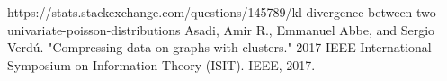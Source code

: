 \documentclass{article}
\begin{document}
\begin{thebibliography}{9}
 https://stats.stackexchange.com/questions/145789/kl-divergence-between-two-univariate-poisson-distributions
 Asadi, Amir R., Emmanuel Abbe, and Sergio Verdú. "Compressing data on graphs with clusters." 2017 IEEE International Symposium on Information Theory (ISIT). IEEE, 2017.
\end{thebibliography}
\end{document}

